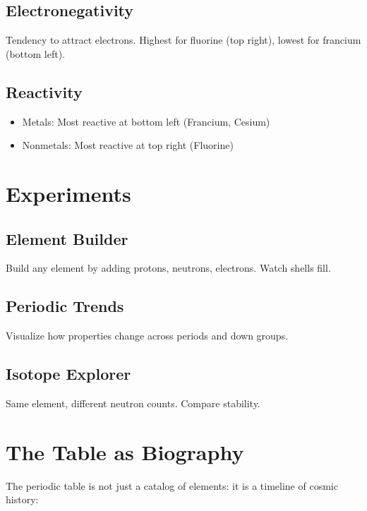 \documentclass[
  11pt,
  letterpaper,
  twoside,
  openright]{book}
\providecommand{\tightlist}{%
  \setlength{\itemsep}{0pt}\setlength{\parskip}{0pt}}
\begin{document}
\subsection{Electronegativity}\label{electronegativity}

Tendency to attract electrons. Highest for fluorine (top right), lowest
for francium (bottom left).

\subsection{Reactivity}\label{reactivity}

\begin{itemize}
\tightlist
\item
  Metals: Most reactive at bottom left (Francium, Cesium)
\item
  Nonmetals: Most reactive at top right (Fluorine)
\end{itemize}

\section{Experiments}\label{experiments-1}

\subsection{Element Builder}\label{element-builder}

Build any element by adding protons, neutrons, electrons. Watch shells
fill.

\subsection{Periodic Trends}\label{periodic-trends-1}

Visualize how properties change across periods and down groups.

\subsection{Isotope Explorer}\label{isotope-explorer}

Same element, different neutron counts. Compare stability.

\section{The Table as Biography}\label{the-table-as-biography}

The periodic table is not just a catalog of elements: it is a timeline
of cosmic history:
\end{document}
